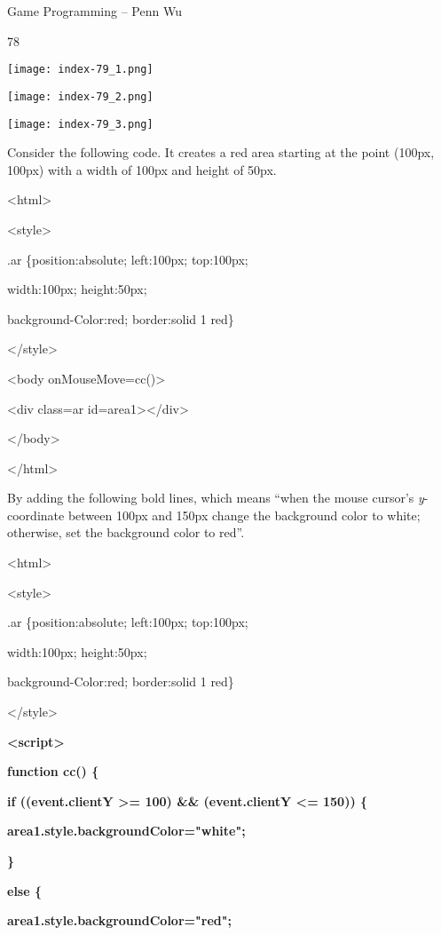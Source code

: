 \documentclass[
]{article}
\begin{document}
Game Programming -- Penn Wu

78

\protect\hypertarget{index_split_006.htmlux5cux23p79}{}{}\texttt{[image: index-79\_1.png]}

\texttt{[image: index-79\_2.png]}

\texttt{[image: index-79\_3.png]}

Consider the following code. It creates a red area starting at the point
(100px, 100px) with a width of 100px and height of 50px.

\textless html\textgreater{}

\textless style\textgreater{}

.ar \{position:absolute; left:100px; top:100px;

width:100px; height:50px;

background-Color:red; border:solid 1 red\}

\textless/style\textgreater{}

\textless body onMouseMove=cc()\textgreater{}

\textless div class=ar id=area1\textgreater\textless/div\textgreater{}

\textless/body\textgreater{}

\textless/html\textgreater{}

By adding the following bold lines, which means ``when the mouse
cursor's \emph{y}-coordinate between 100px and 150px change the
background color to white; otherwise, set the background color to red''.

\textless html\textgreater{}

\textless style\textgreater{}

.ar \{position:absolute; left:100px; top:100px;

width:100px; height:50px;

background-Color:red; border:solid 1 red\}

\textless/style\textgreater{}

\textbf{\textless script\textgreater{}}

\textbf{function cc() \{}

\textbf{if ((event.clientY \textgreater= 100) \&\& (event.clientY
\textless= 150)) \{}

\textbf{area1.style.backgroundColor="white";}

\textbf{\}}

\textbf{else \{}

\textbf{area1.style.backgroundColor="red";}
\end{document}
